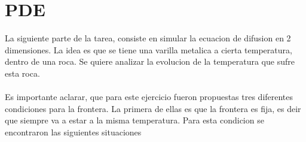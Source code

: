 \documentclass{article}[11]
\begin{document}
\section{PDE }
La siguiente parte de la tarea, consiste en simular la ecuacion de difusion en 2 dimensiones. La idea es que se tiene una varilla metalica a cierta temperatura, dentro de una roca. Se quiere analizar la evolucion de la temperatura que sufre esta roca.
\\
\\
Es importante aclarar, que para este ejercicio fueron propuestas tres diferentes condiciones para la frontera. La primera de ellas es que la frontera es fija, es deir que siempre va a estar a la misma temperatura. Para esta condicion se encontraron las siguientes situaciones






    

    
\end{document}
